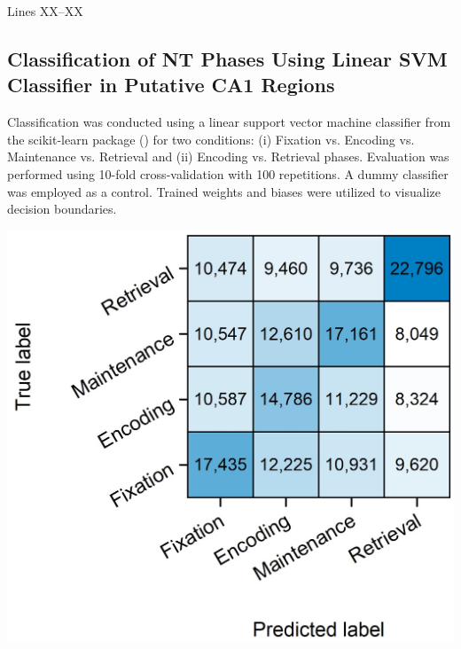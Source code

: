 {
  \color{revision_color}
  \revEditor{}
  Lines XX--XX\\

  \subsection{Classification of NT Phases Using Linear SVM Classifier in Putative CA1 Regions}
  Classification was conducted using a linear support vector machine classifier from the scikit-learn package (\cite{10.5555/1953048.2078195}) for two conditions: (i) Fixation vs. Encoding vs. Maintenance vs. Retrieval and (ii) Encoding vs. Retrieval phases. Evaluation was performed using 10-fold cross-validation with 100 repetitions. A dummy classifier was employed as a control. Trained weights and biases were utilized to visualize decision boundaries.

  \includegraphics{./src/figures/LinearSVC/Figure_ID_SVC.jpg}

}
